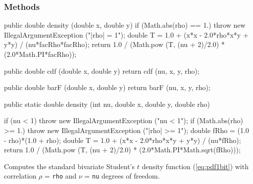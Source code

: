 \subsubsection* {Methods}
\begin{code}\begin{hide}

   public double density (double x, double y) {
      if (Math.abs(rho) == 1.)
         throw new IllegalArgumentException ("|rho| = 1");
      double T = 1.0 + (x*x - 2.0*rho*x*y + y*y) / (nu*facRho*facRho);
      return 1.0 / (Math.pow (T, (nu + 2)/2.0) * (2.0*Math.PI*facRho));
   }

   public double cdf (double x, double y) {
      return cdf (nu, x, y, rho);
   }

   public double barF (double x, double y) {
      return barF (nu, x, y, rho);
   }
\end{hide}

   public static double density (int nu, double x, double y, double rho) \begin{hide} {
      if (nu < 1)
         throw new IllegalArgumentException ("nu < 1");
      if (Math.abs(rho) >= 1.)
         throw new IllegalArgumentException ("|rho| >= 1");
      double fRho = (1.0 - rho)*(1.0 + rho);
      double T = 1.0 + (x*x - 2.0*rho*x*y + y*y) / (nu*fRho);
      return 1.0 / (Math.pow (T, (nu + 2)/2.0) * (2.0*Math.PI*Math.sqrt(fRho)));
   }\end{hide}
\end{code}
\begin{tabb} Computes the standard bivariate Student's $t$ density function
  (\ref{eq:pdf1bit}) with correlation $\rho$ = \texttt{rho} and
   $\nu$  = \texttt{nu}  degrees  of freedom.
\end{tabb}
